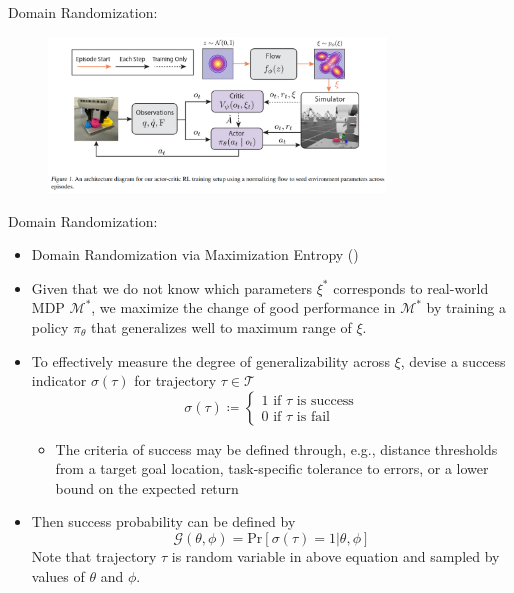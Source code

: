 \documentclass{beamer}
\newcommand{\mc}[1]{\mathcal{#1}}
\begin{document}
\begin{frame}{Domain Randomization: \cite{curtisFlowbasedDomainRandomization2025a}}
    \begin{figure}
    \includegraphics[width=0.8\textwidth]{GoFlowArchitecture.png}
    \end{figure}
\end{frame}


\begin{frame}{Domain Randomization: \cite{tiboniDomainRandomizationEntropy2024}}
    \begin{itemize}
        \item Domain Randomization via Maximization Entropy (\cite{tiboniDomainRandomizationEntropy2024})
        \item Given that we do not know which parameters $\xi^\ast$ corresponds to real-world MDP $\mc{M}^\ast$, we maximize the change of good performance in $\mc{M}^\ast$ by training a policy $\pi_\theta$ that generalizes well to maximum range of $\xi$.
        \item To effectively measure the degree of generalizability across $\xi$, devise a success indicator $\sigma(\tau)$ for trajectory $\tau \in \mc{T}$
        \[
            \sigma(\tau) \coloneqq \begin{cases}
                1 \text{ if } \tau \text{ is success} \\
                0 \text{ if } \tau \text{ is fail}
            \end{cases}
        \]
        \begin{itemize}
            \item  The criteria of success may be defined through, e.g., distance thresholds from a target goal location, task-specific tolerance to errors, or a lower bound on the expected return
        \end{itemize}
        \item Then success probability can be defined by
        \[
            \mc{G}(\theta, \phi) = \text{Pr}[\sigma(\tau) = 1 | \theta, \phi]
        \]
        Note that trajectory $\tau$ is random variable in above equation and sampled by values of $\theta$ and $\phi$.
    \end{itemize}
\end{frame}
\end{document}
